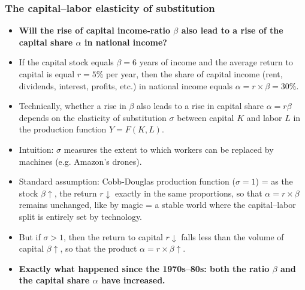 \begin{frame}[label=ElasticityKL,shrink=14]
\frametitle{The capital--labor elasticity of substitution}
\begin{itemize}
\item
\textbf{Will the rise of capital income-ratio $\beta$ also lead to a rise of the capital share $\alpha$ in national income?}
\item
If the capital stock equals $\beta = 6$ years of income and the average return to capital is equal $r = 5\%$ per year, then the share of capital income (rent, dividends, interest, profits, etc.) in national income equals $\alpha = r \times \beta = 30\%$.
\item
Technically, whether a rise in $\beta$ also leads to a rise in capital share $\alpha = r \beta$ depends on the elasticity of substitution $\sigma$ between capital $K$ and labor $L$ in the production function $Y = F(K, L)$.
\item
Intuition: $\sigma$ measures the extent to which workers can be replaced by machines (e.g. Amazon’s drones).
\item
Standard assumption: Cobb-Douglas production function ($\sigma = 1$) = as the stock $\beta \uparrow$, the return $r \downarrow$ exactly in the same proportions, so that $\alpha = r \times \beta$ remains unchanged, like by magic = a stable world where the capital--labor split is entirely set by technology.
\item
But if $\sigma > 1$, then the return to capital $r \downarrow$ falls less than the volume of capital $\beta\uparrow$, so that the product $\alpha = r \times \beta \uparrow$.
\item
\textbf{Exactly what happened since the 1970s--80s: both the ratio $\beta$ and the capital share $\alpha$ have increased.}
\end{itemize}
\end{frame}


